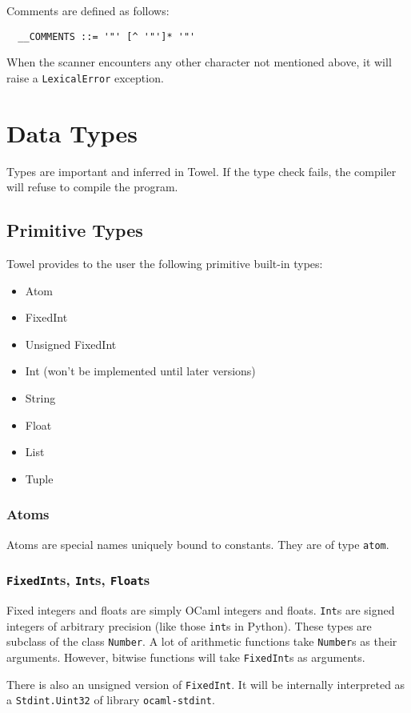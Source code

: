 \documentclass{book}
\begin{document}
Comments are defined as follows:
\begin{verbatim}
  __COMMENTS ::= '"' [^ '"']* '"'
\end{verbatim}

When the scanner encounters any other character not mentioned above, it will raise a \texttt{LexicalError} exception.

\chapter{Data Types}
\label{chap:data-types}

Types are important and inferred in Towel. If the type check fails, the compiler will refuse to compile the program.

\section{Primitive Types}
Towel provides to the user the following primitive built-in types:
\begin{itemize}
\item Atom
\item FixedInt
\item Unsigned FixedInt
\item Int (won't be implemented until later versions)
\item String
\item Float
\item List
\item Tuple
\end{itemize}

\subsection{Atoms}
Atoms are special names uniquely bound to constants. They are of type \texttt{atom}.

\subsection{\texttt{FixedInt}s, \texttt{Int}s, \texttt{Float}s}
Fixed integers and floats are simply OCaml integers and floats. \texttt{Int}s are signed integers of arbitrary precision (like those \texttt{int}s in Python). These types are subclass of the class \texttt{Number}. A lot of arithmetic functions take \texttt{Number}s as their arguments. However, bitwise functions will take \texttt{FixedInt}s as arguments.

There is also an unsigned version of \texttt{FixedInt}. It will be internally interpreted as a \texttt{Stdint.Uint32} of library \texttt{ocaml-stdint}.
\end{document}
